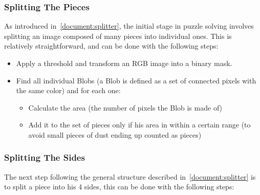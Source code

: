 \documentclass[epsfig,a4paper,11pt,titlepage,twoside,openany]{article}
\begin{document}
\subsubsection{Splitting The Pieces}

As introduced in~\cref{document:splitter},  the initial stage in puzzle solving involves
splitting an image composed of many pieces into individual ones.
This is relatively straightforward, and can be done with the following steps:

\begin{itemize}
  \item Apply a threshold and transform an RGB image into a binary mask.
  \item Find all individual Blobs
  (a Blob is defined as a set of connected pixels with the same color) and for each one:

  \begin{itemize}
  \item Calculate the area (the number of pixels the Blob is made of)

  \item Add it to the set of pieces only if his area in within a certain range (to avoid small pieces of dust ending up counted as pieces)

  \end{itemize}

\end{itemize}

\subsubsection{Splitting The Sides}

The next step following the general structure described in~\cref{document:splitter}
is to split a piece into
his 4 sides, this can be done with the following steps:
\end{document}
